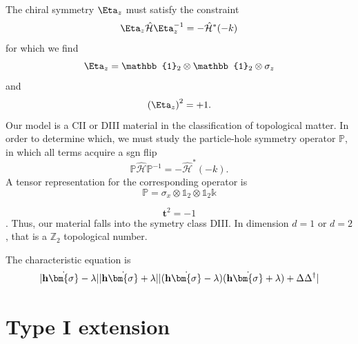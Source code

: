 The chiral symmetry $\Eta_z$ must satisfy the constraint
\begin{equation}
    \Eta_z\hat{\mathcal H}\Eta_z^{-1}=-\hat{\mathcal H}^{*}(-k)
\end{equation}
for which we find
\begin{equation}
    \Eta_z=\mathbb{1}_2\otimes\mathbb{1}_2\otimes\sigma_z
\end{equation}
and
\begin{equation}
    \left(\Eta_z\right)^2=+1.
\end{equation}
Our model is a CII or DIII material in the classification of topological matter.
In order to determine which, we must study the particle-hole symmetry operator $\mathbb{P}$, 
in which all terms acquire a sgn flip
\begin{equation}
    \mathbb{P}\hat{\mathcal H}\mathbb{P}^{-1}=-\hat{\mathcal H}^{*}(-k).
\end{equation}
A tensor representation for the corresponding operator is 
\begin{equation}
    \mathbb{P}=\sigma_x\otimes\mathbb{1}_2\otimes\mathbb{1}_2\mathbb{k}
\end{equation}

\begin{equation}
    \mathbf{t}^{2}=-1
\end{equation}.
Thus, our material falls into the symetry class DIII. In dimension $d=1$ or $d=2$,
that is a $\mathbb{Z}_2$ topological number.

The characteristic equation is
\begin{equation}
    |\mathbf{h}\dot\bm{\sigma}-\lambda|
    |\mathbf{h}\dot\bm{\sigma}+\lambda|
    |(\mathbf{h}\dot\bm{\sigma}-\lambda)(\mathbf{h}\dot\bm{\sigma}+\lambda)+\Delta\Delta^\dagger|
\end{equation}

\section{\label{sec:type_I} Type I extension}
